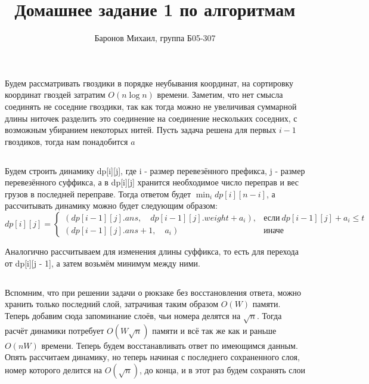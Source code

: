 \documentclass{article}
\title{Домашнее задание 1 по алгоритмам}
\author{Баронов Михаил, группа Б05-307}
\begin{document}
\maketitle

\addtocounter{section}{1}

\begin{center}


\subsection{} %

Будем рассматривать гвоздики в порядке неубывания координат, на сортировку координат гвоздей затратим $O(n\log n)$ времени. Заметим, что нет смысла соединять не соседние гвоздики, так как тогда можно не увеличивая суммарной длины ниточек разделить это соединение на соединение нескольких соседних, с возможным убиранием некоторых нитей. Пусть задача решена для первых $i - 1$ гвоздиков, тогда нам понадобится $a$

\subsection{} %

Будем строить динамику dp[i][j], где i - размер перевезённого префикса, j - размер перевезённого суффикса, а в dp[i][j] хранится необходимое число переправ и вес грузов в последней переправе. Тогда ответом будет $\min_i dp[i][n - i]$, а рассчитывать динамику можно будет следующим образом:
\[
dp[i][j] = 
\begin{cases}
    (dp[i - 1][j].ans,\quad dp[i - 1][j].weight + a_i), & \text{если}\ dp[i - 1][j] + a_i \leq t \\
    (dp[i - 1][j].ans + 1,\quad a_i) & \text{иначе}
\end{cases}
\]

Аналогично рассчитываем для изменения длины суффикса, то есть для перехода от dp[i][j - 1], а затем возьмём минимум между ними.


\subsection{} %

Вспомним, что при решении задачи о рюкзаке без восстановления ответа, можно хранить только последний слой, затрачивая таким образом $O(W)$ памяти. Теперь добавим сюда запоминание слоёв, чьи номера делятся на $\sqrt{n}$. Тогда расчёт динамики потребует $O(W\sqrt{n})$ памяти и всё так же как и раньше $O(nW)$ времени. Теперь будем восстанавливать ответ по имеющимся данным. Опять рассчитаем динамику, но теперь начиная с последнего сохраненного слоя, номер которого делится на $O(\sqrt{n})$, до конца, и в этот раз будем сохранять слои


\end{center}
\end{document}
